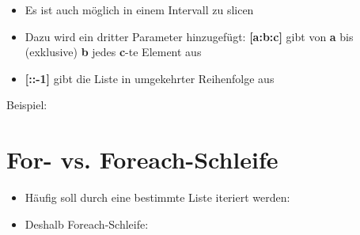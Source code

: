 \begin{frame}
    \slidehead
    \begin{itemize}
        \item Es ist auch möglich in einem Intervall zu slicen
            \pause
        \item Dazu wird ein dritter Parameter hinzugefügt: \textbf{[a:b:c]} gibt von \textbf{a} bis (exklusive) \textbf{b} jedes \textbf{c}-te Element aus
            \pause
        \item \textbf{[::-1]} gibt die Liste in umgekehrter Reihenfolge aus
    \end{itemize}
    \pause
    \vspace{-0.1cm}
    \begin{block}{Beispiel:}
    \end{block}
\end{frame}

\livecoding


\subtitle{Kapitel 5: ganz viele Variablen in einer}

\section{For- vs. Foreach-Schleife}
\begin{frame}
    \slidehead

    \begin{itemize}
        \item Häufig soll durch eine bestimmte Liste iteriert werden:
            \pause

        \item Deshalb Foreach-Schleife:
    \end{itemize}
\end{frame}

